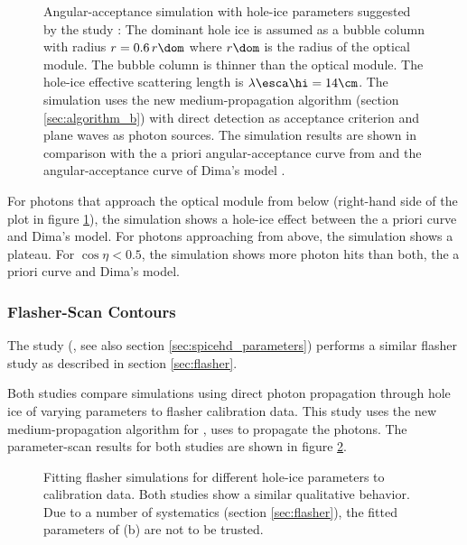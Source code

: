 
\begin{figure}[htbp]
  \caption{Angular-acceptance simulation with hole-ice parameters suggested by the  study \cite{martinspicehddard}: The dominant hole ice is assumed as a bubble column with radius $r = 0.6\,r\dom$ where $r\dom$ is the radius of the optical module. The bubble column is thinner than the optical module. The hole-ice effective scattering length is $\lambda\esca\hi = 14\cm$. The simulation uses the new medium-propagation algorithm (section \ref{sec:algorithm_b}) with direct detection as acceptance criterion and plane waves as photon sources. The simulation results are shown in comparison with the a priori angular-acceptance curve from \cite{icepaper} and the angular-acceptance curve of Dima's model \cite{flasherdataderivedicemodels}.}
  \label{fig:ku3Zie8z}
\end{figure}

For photons that approach the optical module from below (right-hand side of the plot in figure \ref{fig:ku3Zie8z}), the simulation shows a hole-ice effect between the a priori curve and Dima's model. For photons approaching from above, the simulation shows a plateau. For $\cos\eta < 0.5$, the simulation shows more photon hits than both, the a priori curve and Dima's model.


\subsubsection{ Flasher-Scan Contours}
\label{sec:spicehd_flasher_scan_contours}

The  study (, see also section \ref{sec:spicehd_parameters}) performs a similar flasher study as described in section \ref{sec:flasher}.

Both studies compare simulations using direct photon propagation through hole ice of varying parameters to flasher calibration data. This study uses the new medium-propagation algorithm for \clsim,  uses \ppc to propagate the photons. The parameter-scan results for both studies are shown in figure \ref{fig:ahCoHee4}.

\begin{figure}[htbp]
  \hfill
  \caption{Fitting flasher simulations for different hole-ice parameters to calibration data. Both studies show a similar qualitative behavior. Due to a number of systematics (section \ref{sec:flasher}), the fitted parameters of (b) are not to be trusted.}
  \label{fig:ahCoHee4}
\end{figure}

